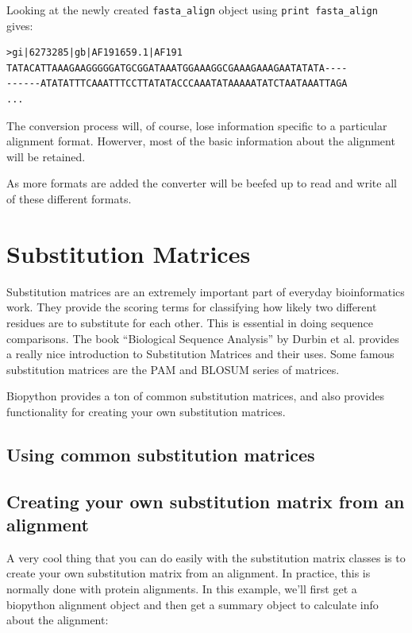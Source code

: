 \documentclass{report}
\begin{document}
Looking at the newly created \verb|fasta_align| object using \verb|print fasta_align| gives:

\begin{verbatim}
>gi|6273285|gb|AF191659.1|AF191
TATACATTAAAGAAGGGGGATGCGGATAAATGGAAAGGCGAAAGAAAGAATATATA----
------ATATATTTCAAATTTCCTTATATACCCAAATATAAAAATATCTAATAAATTAGA
...
\end{verbatim}

The conversion process will, of course, lose information specific to a particular alignment format. Howerver, most of the basic information about the alignment will be retained.


As more formats are added the converter will be beefed up to read and write all of these different formats.

\section{Substitution Matrices}
\label{sec:sub_matrix}

Substitution matrices are an extremely important part of everyday bioinformatics work. They provide the scoring terms for classifying how likely two different residues are to substitute for each other. This is essential in doing sequence comparisons. The book ``Biological Sequence Analysis'' by Durbin et al. provides a really nice introduction to Substitution Matrices and their uses. Some famous substitution matrices are the PAM and BLOSUM series of matrices.


Biopython provides a ton of common substitution matrices, and also provides functionality for creating your own substitution matrices.

\subsection{Using common substitution matrices}

\subsection{Creating your own substitution matrix from an alignment}
\label{sec:subs_mat_ex}

A very cool thing that you can do easily with the substitution matrix
classes is to create your own substitution matrix from an
alignment. In practice, this is normally done with protein
alignments. In this example, we'll first get a biopython alignment
object and then get a summary object to calculate info about the
alignment:
\end{document}
